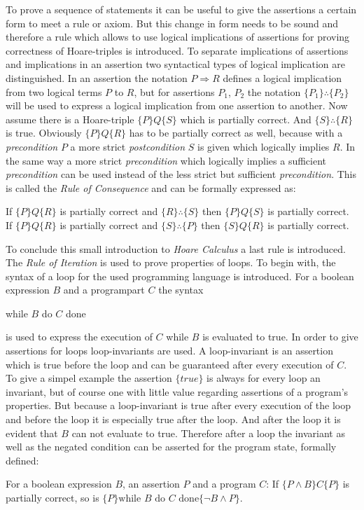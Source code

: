 	To prove a sequence of statements it can be useful to give the assertions a
	certain form to meet a rule or axiom. But this change in form needs to be
	sound and therefore a rule which allows to use logical implications of assertions for
	proving correctness of Hoare-triples is introduced. To separate implications
	of assertions and implications in an assertion two syntactical types of
	logical implication are distinguished. In an assertion
	the notation $P\Rightarrow R$ defines a logical implication from two logical
	terms $P$ to $R$,
	but for assertions $P_1$, $P_2$ the notation $\{P_1\} \therefore \{P_2\}$ will
	be used to express a logical implication from one assertion to another. Now
	assume there is a Hoare-triple $\{P\}Q\{S\}$ which is partially correct. And
	$\{S\}\therefore\{R\}$ is true. Obviously $\{P\}Q\{R\}$ has to be
	partially correct as well, because with a \emph{precondition} $P$ a more strict
	\emph{postcondition} $S$ is given which logically implies $R$. In the same way
	a more strict \emph{precondition} which logically implies a sufficient
	\emph{precondition} can be used instead of the less strict but sufficient
	\emph{precondition}. This is called the \emph{Rule of Consequence} and can be
	formally expressed as:
	\begin{mydef}
		If $\{P\}Q\{R\}$ is partially correct and $\{R\}\therefore\{S\}$
		then $\{P\}Q\{S\}$ is partially correct.\\
		If $\{P\}Q\{R\}$ is partially correct and $\{S\}\therefore\{P\}$
		then $\{S\}Q\{R\}$ is partially correct.
	\end{mydef}


	To conclude this small introduction to \emph{Hoare Calculus} a last rule
	is introduced. The \emph{Rule of Iteration} is used to prove properties of
	loops. To begin with, the syntax of a loop for the used programming language
	is introduced. For a boolean expression $B$ and a programpart $C$ the syntax
	\begin{center} while $B$ do $C$ done \end{center} is used to express the
	execution of $C$ while $B$ is evaluated to true. In order to give assertions
	for loops loop-invariants are used. A loop-invariant is an assertion which
	is true before the loop and can be guaranteed after every execution of $C$.
	To give a simpel example the assertion $\{\textit{true}\}$ is always for every
	loop an invariant, but of course one with little value regarding assertions
	of a program's properties. But because a loop-invariant is true after every
	execution of the loop and before the loop it is especially true after the
	loop. And after the loop it is evident that $B$ can not evaluate to true.
	Therefore after a loop the invariant as well as the negated condition can
	be asserted for the program state, formally defined:
	\begin{mydef}
		For a boolean expression $B$, an assertion $P$ and a program $C$: If
		$\{P \land B\}C\{P\}$ is partially correct, so is
		$\{P\}\text{while } B \text{ do } C \text{ done}\{\lnot B \land P\}$.
	\end{mydef}


